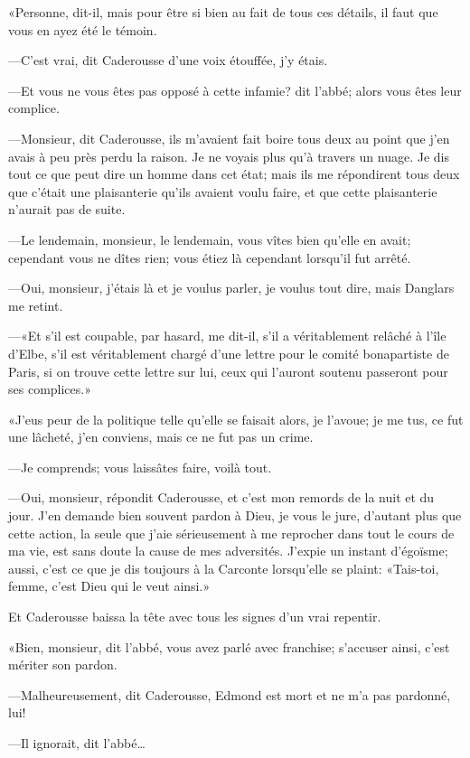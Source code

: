 «Personne, dit-il, mais pour être si bien au fait de tous ces détails, il faut que vous en ayez été le témoin.

—C'est vrai, dit Caderousse d'une voix étouffée, j'y étais.

—Et vous ne vous êtes pas opposé à cette infamie? dit l'abbé; alors vous êtes leur complice.

—Monsieur, dit Caderousse, ils m'avaient fait boire tous deux au point que j'en avais à peu près perdu la raison. Je ne voyais plus qu'à travers un nuage. Je dis tout ce que peut dire un homme dans cet état; mais ils me répondirent tous deux que c'était une plaisanterie qu'ils avaient voulu faire, et que cette plaisanterie n'aurait pas de suite.

—Le lendemain, monsieur, le lendemain, vous vîtes bien qu'elle en avait; cependant vous ne dîtes rien; vous étiez là cependant lorsqu'il fut arrêté.

—Oui, monsieur, j'étais là et je voulus parler, je voulus tout dire, mais Danglars me retint.

—«Et s'il est coupable, par hasard, me dit-il, s'il a véritablement relâché à l'île d'Elbe, s'il est véritablement chargé d'une lettre pour le comité bonapartiste de Paris, si on trouve cette lettre sur lui, ceux qui l'auront soutenu passeront pour ses complices.»

«J'eus peur de la politique telle qu'elle se faisait alors, je l'avoue; je me tus, ce fut une lâcheté, j'en conviens, mais ce ne fut pas un crime.

—Je comprends; vous laissâtes faire, voilà tout.

—Oui, monsieur, répondit Caderousse, et c'est mon remords de la nuit et du jour. J'en demande bien souvent pardon à Dieu, je vous le jure, d'autant plus que cette action, la seule que j'aie sérieusement à me reprocher dans tout le cours de ma vie, est sans doute la cause de mes adversités. J'expie un instant d'égoïsme; aussi, c'est ce que je dis toujours à la Carconte lorsqu'elle se plaint: «Tais-toi, femme, c'est Dieu qui le veut ainsi.»

Et Caderousse baissa la tête avec tous les signes d'un vrai repentir.

«Bien, monsieur, dit l'abbé, vous avez parlé avec franchise; s'accuser ainsi, c'est mériter son pardon.

—Malheureusement, dit Caderousse, Edmond est mort et ne m'a pas pardonné, lui!

—Il ignorait, dit l'abbé\dots

